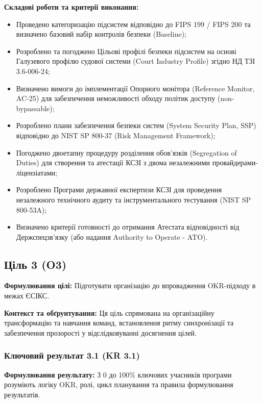 \documentclass{article}
\begin{document}
\vspace{10pt}
\textbf{Складові роботи та критерії виконання:}
\begin{itemize}
    \item Проведено категоризацію підсистем відповідно до FIPS 199 / FIPS 200 та визначено базовий набір контролів безпеки (Baseline);
    \item Розроблено та погоджено Цільові профілі безпеки підсистем на основі Галузевого профілю судової системи (Court Industry Profile) згідно НД ТЗІ 3.6-006-24;
    \item Визначено вимоги до імплементації Опорного монітора (Reference Monitor, AC-25) для забезпечення неможливості обходу політик доступу (non-bypassable);
    \item Розроблено плани забезпечення безпеки систем (System Security Plan, SSP) відповідно до NIST SP 800-37 (Risk Management Framework);
    \item Погоджено двоетапну процедуру розділення обов'язків (Segregation of Duties) для створення та атестації КСЗІ з двома незалежними провайдерами-ліцензіатами;
    \item Розроблено Програми державної експертизи КСЗІ для проведення незалежного технічного аудиту та інструментального тестування (NIST SP 800-53A);
    \item Визначено критерії готовності до отримання Атестата відповідності від Держспецзв'язку (або надання Authority to Operate - ATO).
\end{itemize}

\newpage

\subsection{Ціль 3 (O3)}

\textbf{Формулювання цілі:} Підготувати організацію до впровадження OKR-підходу в межах ЄСІКС.

\textbf{Контекст та обґрунтування:}
Ця ціль спрямована на організаційну трансформацію та навчання команд, встановлення ритму синхронізації та забезпечення прозорості у відслідковуванні досягнення цілей.

\subsubsection{Ключовий результат 3.1 (KR 3.1)}

\textbf{Формулювання результату:} З 0 до 100\% ключових учасників програми розуміють логіку OKR, ролі, цикл планування та правила формулювання результатів.
\end{document}
